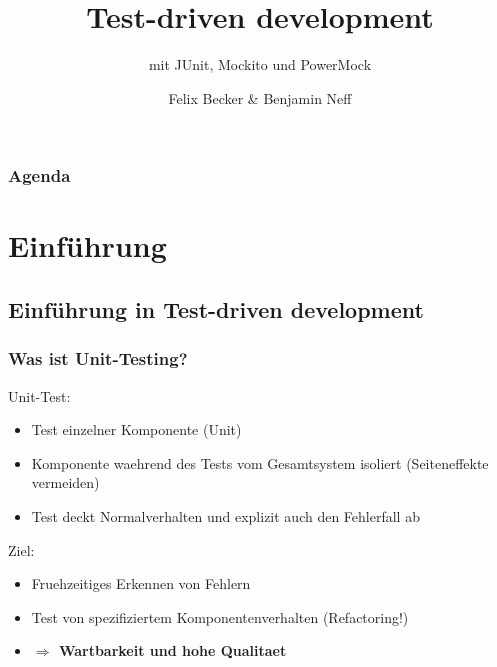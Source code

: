 \documentclass{beamer}
\title{Test-driven development}
\subtitle{mit JUnit, Mockito und PowerMock}
\institute[TD 2k11]{Computerseminar Tondorf 2011}
\author[F. Becker, B. Neff]{
        Felix Becker \& 
	Benjamin Neff
}
\begin{document}
	\begin{frame}
		\titlepage
	\end{frame}

	\begin{frame}
		\frametitle{Agenda}
		\setcounter{tocdepth}{1}
		\tableofcontents
	\end{frame}
	

	\section{Einführung}
	
		\subsection{Einführung in Test-driven development}

			\begin{frame}
				\frametitle{Was ist Unit-Testing?}
				Unit-Test:
				\begin{itemize}
					\item{Test einzelner Komponente (Unit)}
					\item{Komponente waehrend des Tests vom Gesamtsystem isoliert (Seiteneffekte vermeiden)}
					\item{Test deckt Normalverhalten und explizit auch den Fehlerfall ab}
				\end{itemize}
				\pause
				Ziel:
				\begin{itemize}
					\item{Fruehzeitiges Erkennen von Fehlern}
					\item{Test von spezifiziertem Komponentenverhalten (Refactoring!)}
					\item{\color{red}\textbf{$\Rightarrow$ Wartbarkeit und hohe Qualitaet}} %
				\end{itemize}
				
			\end{frame}
\end{document}
